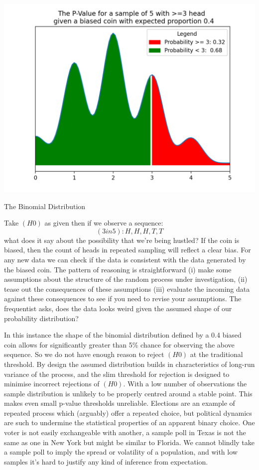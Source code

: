 \documentclass{tufte-handout}
\begin{document}
\begin{marginfigure}
  \includegraphics[width=\linewidth]{../Expectation/Plots/binomial_test.png}
  \caption{The Binomial Distribution}
\end{marginfigure}


\noindent Take $(H0)$ as given then if we observe a sequence: $$ (3in5): H, H, H, T, T$$ what does it say about the possibility that we're being hustled? If the coin is biased, then the count of heads in repeated sampling will reflect a clear bias. For any new data we can check if the data is consistent with the data generated by the biased coin. The pattern of reasoning is straightforward (i) make some assumptions about the structure of the random process under investigation, (ii) tease out the consequences of these assumptions (iii) evaluate the incoming data against these consequences to see if you need to revise your assumptions. The frequentist asks, does the data looks weird given the assumed shape of our probability distribution?
\linebreak

\noindent In this instance the shape of the binomial distribution defined by a 0.4 biased coin allows for significantly greater than  5\% chance for observing the above sequence. So we do not have enough reason to reject $(H0)$ at the traditional threshold. By design the assumed distribution builds in characteristics of long-run variance of the process, and the slim threshold for rejection is designed to minimise incorrect rejections of $(H0)$. With a low number of observations the sample distribution is unlikely to be properly centred around a stable point. This makes even small p-value thresholds unreliable. Elections are an example of repeated process which (arguably) offer a repeated choice, but political dynamics are such to undermine the statistical properties of an apparent binary choice. One voter is not easily exchangeable with another, a sample poll in Texas is not the same as one in New York but might be similar to Florida. We cannot blindly take a sample poll to imply the spread or volatility of a population, and with low samples it's hard to justify any kind of inference from expectation.
\end{document}
